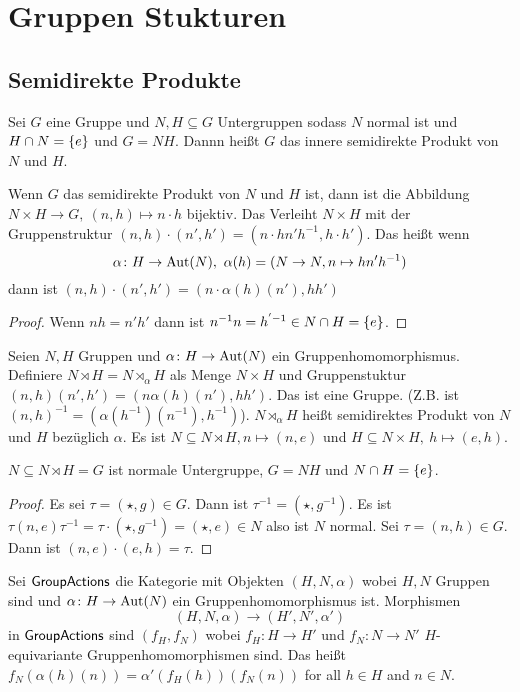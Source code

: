 \section{Gruppen Stukturen}
\subsection{Semidirekte Produkte}
\begin{Def}
    Sei \(G\) eine Gruppe und \(N,H\subseteq  G\) Untergruppen sodass \(N\) normal ist 
    und \(H\cap N=\{e\}\) und \(G=NH\). Dannn heißt \(G\) das innere semidirekte Produkt von \(N\) und \(H\).
\end{Def}
\begin{Bem}
    Wenn \(G\) das semidirekte Produkt von \(N\) und \(H\) ist, dann ist die Abbildung \(N\times H\to G,\ (n,h)\mapsto n\cdot h\) bijektiv. Das Verleiht \(N\times H\) mit der Gruppenstruktur \((n,h)\cdot (n',h')=(n\cdot hn'h^{-1},h\cdot h')\). Das heißt wenn \[\alpha\colon H\to\Aut(N),\ \alpha(h)=(N\to N, n\mapsto hn'h^{-1})\] dann ist \((n,h)\cdot(n',h')=(n\cdot\alpha(h)(n'),hh')\)
\end{Bem}
\begin{proof}
    Wenn \(nh=n'h'\) dann ist \(n^{-1}n=h^{'-1}\in N\cap H=\{e\}\).
\end{proof}
\begin{Def}
    Seien \(N,H\) Gruppen und \(\alpha\colon H\to\operatorname{Aut}(N)\) ein Gruppenhomomorphismus. Definiere \(N\rtimes H=N\rtimes_\alpha H\) als Menge \(N\times H\) und Gruppenstuktur \((n,h)(n',h')=(n\alpha(h)(n'),hh')\). Das ist eine Gruppe. (Z.B. ist \((n,h)^{-1}=(\alpha(h^{-1})(n^{-1}),h^{-1})\)). \(N\rtimes_\alpha H\) heißt semidirektes Produkt von \(N\) und \(H\) bezüglich \(\alpha\).
    Es ist \(N\subseteq N\rtimes H, n\mapsto (n,e)\) und \(H\subseteq N\times H,\ h\mapsto (e,h)\).
\end{Def}
\begin{Lemma}
    \(N\subseteq N\rtimes H=G\) ist normale Untergruppe, \(G=NH\) und \(N\cap H=\{e\}\).
\end{Lemma}
\begin{proof}
    Es sei \(\tau=(\star,g)\in G\). Dann ist \(\tau^{-1}=(\star,g^{-1})\).
    Es ist \(\tau(n,e)\tau^{-1}=\tau\cdot(\star,g^{-1})=(\star,e)\in N\) also ist \(N\) normal. 
    Sei \(\tau=(n,h)\in G\). Dann ist \((n,e)\cdot (e, h)=\tau\).
\end{proof}
\begin{Def}
    Sei \(\mathsf{GroupActions}\) die Kategorie mit Objekten \((H,N,\alpha)\) wobei \(H,N\) Gruppen sind und \(\alpha\colon H\to\operatorname{Aut}(N)\) ein Gruppenhomomorphismus ist. Morphismen \[(H,N,\alpha)\to (H',N',\alpha')\] in \(\mathsf{GroupActions}\) sind \((f_H,f_N)\) wobei \(f_H\colon H\to H'\)  und \(f_N\colon N\to N'\) \(H\)-equivariante Gruppenhomomorphismen sind. Das heißt
    \(f_N(\alpha(h)(n))=\alpha'(f_H(h))(f_N(n))\) for all \(h\in H\) and \(n\in N\).
\end{Def}
